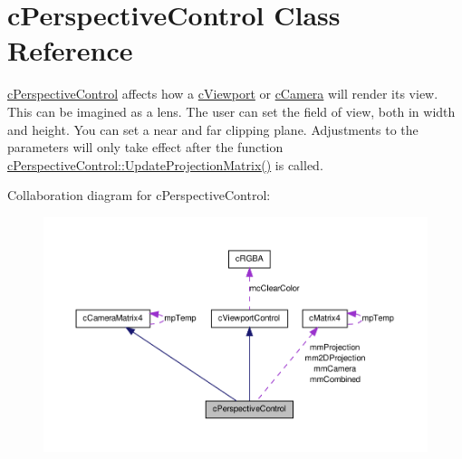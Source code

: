 \hypertarget{classc_perspective_control}{
\section{cPerspectiveControl Class Reference}
\label{classc_perspective_control}
}


\hyperlink{classc_perspective_control}{cPerspectiveControl} affects how a \hyperlink{classc_viewport}{cViewport} or \hyperlink{classc_camera}{cCamera} will render its view. This can be imagined as a lens. The user can set the field of view, both in width and height. You can set a near and far clipping plane. Adjustments to the parameters will only take effect after the function \hyperlink{classc_perspective_control_a21f71c817289e0f250dbe9fa83f269bd}{cPerspectiveControl::UpdateProjectionMatrix()} is called.  




Collaboration diagram for cPerspectiveControl:\nopagebreak
\begin{figure}[H]
\begin{center}
\leavevmode
\includegraphics[width=400pt]{classc_perspective_control__coll__graph}
\end{center}
\end{figure}
